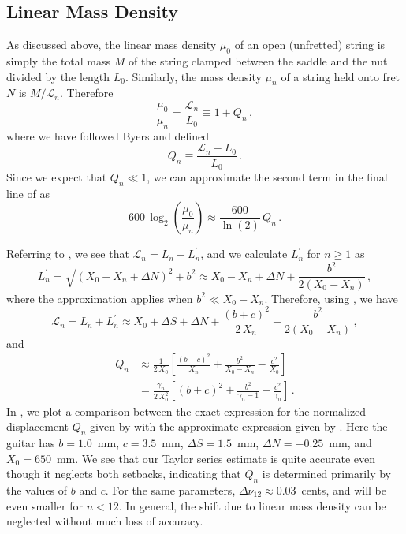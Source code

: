  \subsection{Linear Mass Density}
As discussed above, the linear mass density $\mu_0$ of an open (unfretted) string is simply the total mass $M$ of the string clamped between the saddle and the nut divided by the length $L_0$. Similarly, the mass density $\mu_n$ of a string held onto fret $N$ is $M/\mathcal{L}_n$. Therefore
 \begin{equation}
\frac{\mu_0}{\mu_n} = \frac{\mathcal{L}_n}{L_0} \equiv 1 + Q_n\, ,
 \end{equation}
where we have followed Byers and defined~\cite{ref:byers1996cgi,ref:varieschi2010icf}
 \begin{equation} \label{eqn:q_n_def}
Q_n \equiv \frac{\mathcal{L}_n - L_0}{L_0}\, .
 \end{equation}
Since we expect that $Q_n \ll 1$, we can approximate the second term in the final line of  as
 \begin{equation} \label{eqn:lmd_error}
600\, \log_2 \left(  \frac{\mu_0}{\mu_n} \right) \approx \frac{600}{\ln(2)}\, Q_n\, .
 \end{equation}

Referring to , we see that $\mathcal{L}_n = L_n + L^\prime_n$, and we calculate $L^\prime_n$ for $n \ge 1$ as
 \begin{equation} \label{eqn:l_p_def}
L^\prime_n = \sqrt{\left(X_0 - X_n + \Delta N\right)^2 + b^2} \approx X_0 - X_n + \Delta N + \frac{b^2}{2 \left(X_0 - X_n\right)}\, ,
 \end{equation}
where the approximation applies when $b^2 \ll X_0 - X_n$. Therefore, using , we have
 \begin{equation}
\mathcal{L}_n = L_n + L^\prime_n \approx X_0 + \Delta S + \Delta N + \frac{(b + c)^2}{2\, X_n} + \frac{b^2}{2 \left(X_0 - X_n\right)}\, ,
 \end{equation}
and
 \begin{equation} \label{eqn:q_n_approx}
 \begin{split}
Q_n &\approx \frac{1}{2\, X_0} \left[ \frac{(b + c)^2}{X_n} + \frac{b^2}{X_0 - X_n} - \frac{c^2}{X_0} \right] \\
&= \frac{\gamma_n}{2\, X_0^2} \left[ (b + c)^2 + \frac{b^2}{\gamma_{n} - 1} - \frac{c^2}{\gamma_n} \right] \, .
 \end{split}
 \end{equation}
In , we plot a comparison between the exact expression for the normalized displacement $Q_n$ given by  with the approximate expression given by . Here the guitar has $b = 1.0$~mm, $c = 3.5$~mm, $\Delta S = 1.5$~mm, $\Delta N = -0.25$~mm, and $X_0 = 650$~mm. We see that our Taylor series estimate is quite accurate even though it neglects both setbacks, indicating that $Q_n$ is determined primarily by the values of $b$ and $c$. For the same parameters, $\Delta \nu_{12} \approx 0.03$~cents, and will be even smaller for $n < 12$. In general, the shift due to linear mass density can be neglected without much loss of accuracy.

